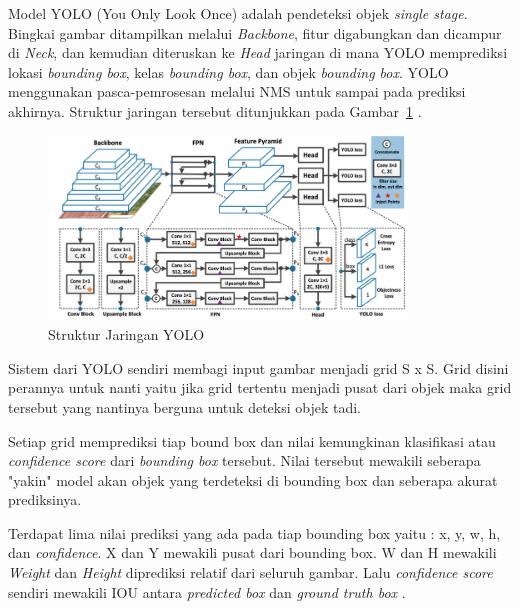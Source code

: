 \par Model YOLO (You Only Look Once) adalah pendeteksi objek \textit{single stage}. Bingkai gambar ditampilkan melalui \emph{\textit{Backbone}}, fitur digabungkan dan dicampur di \emph{\textit{Neck}}, dan kemudian diteruskan ke \emph{\textit{Head}} jaringan di mana YOLO memprediksi lokasi \emph{\textit{bounding box}}, kelas \emph{\textit{bounding box}}, dan objek \emph{\textit{bounding box}}. YOLO menggunakan pasca-pemrosesan melalui NMS untuk sampai pada prediksi akhirnya. Struktur jaringan tersebut ditunjukkan pada Gambar~\ref{fig:strukturyolo} \cite{strukturyolo}.

\begin{figure}[ht]
  \centering
  \includegraphics[width=0.85\textwidth]{gambar/arsitektur_yolo.png}
  \caption{Struktur Jaringan YOLO}
  \label{fig:strukturyolo}
\end{figure}

\par Sistem dari YOLO sendiri membagi input gambar menjadi grid S x S. Grid disini perannya untuk nanti yaitu jika grid tertentu menjadi pusat dari objek maka grid tersebut yang nantinya berguna untuk deteksi objek tadi.

\par Setiap grid memprediksi tiap bound box dan nilai kemungkinan klasifikasi atau \emph{confidence score} dari \emph{bounding box} tersebut. Nilai tersebut mewakili seberapa "yakin" model akan objek yang terdeteksi di bounding box dan seberapa akurat prediksinya.

\par Terdapat lima nilai prediksi yang ada pada tiap bounding box yaitu : x, y, w, h, dan \emph{confidence}. X dan Y mewakili pusat dari bounding box. W dan H mewakili \emph{Weight} dan \emph{Height} diprediksi relatif dari seluruh gambar. Lalu \emph{confidence score} sendiri mewakili IOU antara \emph{predicted box} dan \emph{ground truth box} \cite{redmon2016you}.

